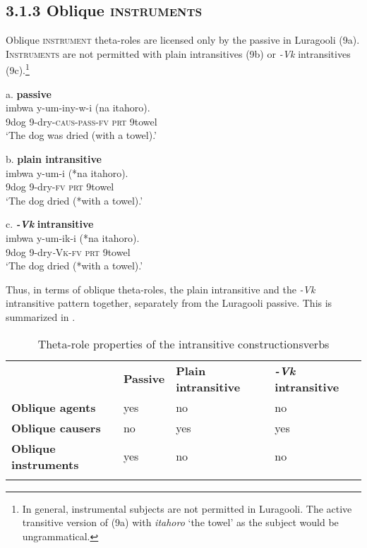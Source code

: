 \documentclass[output=paper]{langsci/langscibook}
\begin{document}
\subsection{3.1.3 Oblique \textsc{instruments}}

Oblique \textsc{instrument} theta-roles are licensed only by the passive in Luragooli (9a). \textsc{Instruments} are not permitted with plain intransitives (9b) or \textit{{}-Vk} intransitives (9c).\footnote{ In general, instrumental subjects are not permitted in Luragooli. The active transitive version of (9a) with \textit{itahoro} ‘the towel’ as the subject would be ungrammatical.} 

\ea
{a. \textbf{passive}}\\
\gll imbwa y-um-iny-w-i            (na    itahoro).\\
     9dog 9-dry-\textsc{caus}{}-\textsc{pass}{}-\textsc{fv}   \textsc{prt}  9towel\\
\glt ‘The dog was dried (with a towel).’
\z

\ea
{b. \textbf{plain intransitive}}\\
\gll imbwa y-um-i          (*na   itahoro).\\
     9dog   9-dry-\textsc{fv}         \textsc{prt} 9towel\\
\glt ‘The dog dried (*with a towel).’
\z

\ea
{c. \textbf{\textit{{}-Vk}}\textbf{ intransitive}}\\
\gll imbwa  y-um-ik-i      (*na  itahoro).\\
     9dog    9-dry\textit{{}-}\textsc{Vk}{}-\textsc{fv} \textsc{prt} 9towel\\
\glt ‘The dog dried (*with a towel).’
\z

Thus, in terms of oblique theta-roles, the plain intransitive and the \textit{{}-Vk} intransitive pattern together, separately from the Luragooli passive. This is summarized in .
 
\begin{table}
\caption{Theta-role properties of the intransitive constructionsverbs}
\label{tab:2}

\begin{tabularx}{\textwidth}{XXXX} & \textbf{Passive} & \textbf{Plain intransitive} & \textbf{\textit{{}-Vk }}\textbf{intransitive}\\
\lsptoprule
\textbf{Oblique agents} & yes & no & no\\
\textbf{Oblique causers} & no & yes & yes\\
\textbf{Oblique instruments} & yes & no & no\\
\lspbottomrule
\end{tabularx}

\end{table} 
\end{document}
